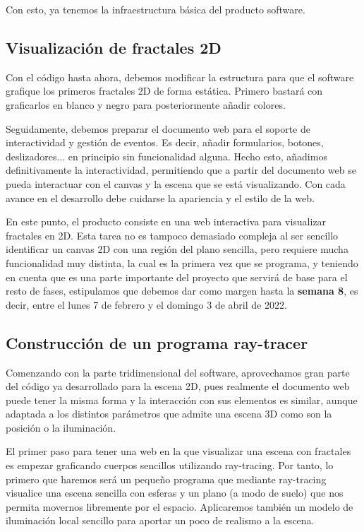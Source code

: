 Con esto, ya tenemos la infraestructura básica del producto software.

\subsection{Visualización de fractales 2D}

Con el código hasta ahora, debemos modificar la estructura para que el software grafique los primeros fractales 2D de forma estática. Primero bastará con graficarlos en blanco y negro para posteriormente añadir colores.

Seguidamente, debemos preparar el documento web para el soporte de interactividad y gestión de eventos. Es decir, añadir formularios, botones, deslizadores... en principio sin funcionalidad alguna. Hecho esto, añadimos definitivamente la interactividad, permitiendo que a partir del documento web se pueda interactuar con el canvas y la escena que se está visualizando. Con cada avance en el desarrollo debe cuidarse la apariencia y el estilo de la web.

En este punto, el producto consiste en una web interactiva para visualizar fractales en 2D. Esta tarea no es tampoco demasiado compleja al ser sencillo identificar un canvas 2D con una región del plano sencilla, pero requiere mucha funcionalidad muy distinta, la cual es la primera vez que se programa, y teniendo en cuenta que es una parte importante del proyecto que servirá de base para el resto de fases, estipulamos que debemos dar como margen hasta la \textbf{semana 8}, es decir, entre el lunes 7 de febrero y el domingo 3 de abril de 2022.

\subsection{Construcción de un programa ray-tracer}

Comenzando con la parte tridimensional del software, aprovechamos gran parte del código ya desarrollado para la escena 2D, pues realmente el documento web puede tener la misma forma y la interacción con sus elementos es similar, aunque adaptada a los distintos parámetros que admite una escena 3D como son la posición o la iluminación.

El primer paso para tener una web en la que visualizar una escena con fractales es empezar graficando cuerpos sencillos utilizando ray-tracing. Por tanto, lo primero que haremos será un pequeño programa que mediante ray-tracing visualice una escena sencilla con esferas y un plano (a modo de suelo) que nos permita movernos libremente por el espacio. Aplicaremos también un modelo de iluminación local sencillo para aportar un poco de realismo a la escena.

